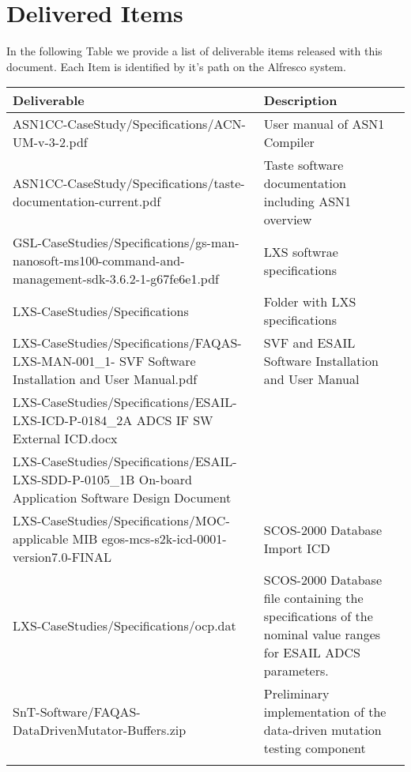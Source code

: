 
\section*{Delivered Items}
\label{sec:deliverables}

In the following Table we provide a list of deliverable items released with this document. Each Item is identified by it's path on the Alfresco system.

\setlength\LTleft{0pt}
\setlength\LTright{0pt}
\tiny 
\begin{longtable}{|p{9cm}|p{6cm}@{}}
\label{table:deliverables} \\
\hline
\textbf{Deliverable}&Description\\
\hline
ASN1CC-CaseStudy/Specifications/ACN-UM-v-3-2.pdf&User manual of ASN1 Compiler\\
ASN1CC-CaseStudy/Specifications/taste-documentation-current.pdf&Taste software documentation including ASN1 overview\\
\hline
GSL-CaseStudies/Specifications/gs-man-nanosoft-ms100-command-and-management-sdk-3.6.2-1-g67fe6e1.pdf&LXS softwrae specifications\\
\hline
LXS-CaseStudies/Specifications&Folder with LXS specifications\\
LXS-CaseStudies/Specifications/FAQAS-LXS-MAN-001\_1- SVF Software Installation and User Manual.pdf&SVF and ESAIL Software Installation and User Manual\\
LXS-CaseStudies/Specifications/ESAIL-LXS-ICD-P-0184\_2A ADCS IF SW External ICD.docx&\\
LXS-CaseStudies/Specifications/ESAIL-LXS-SDD-P-0105\_1B On-board Application Software Design Document&\\
LXS-CaseStudies/Specifications/MOC-applicable MIB egos-mcs-s2k-icd-0001-version7.0-FINAL&SCOS-2000 Database Import ICD\\
LXS-CaseStudies/Specifications/ocp.dat&SCOS-2000 Database file containing the specifications of the nominal value ranges for ESAIL ADCS parameters.\\
\hline
SnT-Software/FAQAS-DataDrivenMutator-Buffers.zip&Preliminary implementation of the data-driven mutation testing component\\
\\
\hline


                                                    
\end{longtable}
\normalsize

\clearpage